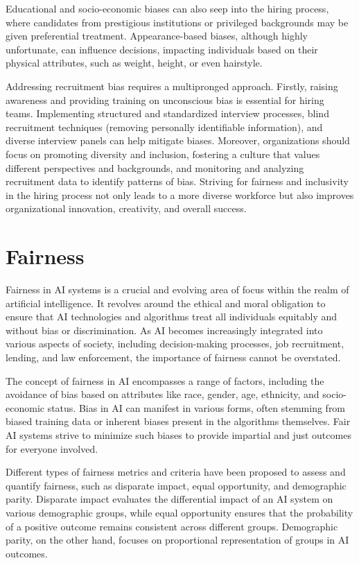 \documentclass[12pt,a4paper,openright,twoside]{book}
\begin{document}
Educational and socio-economic biases can also seep into the hiring process, where candidates from prestigious institutions or privileged backgrounds may be given preferential treatment. Appearance-based biases, although highly unfortunate, can influence decisions, impacting individuals based on their physical attributes, such as weight, height, or even hairstyle.

Addressing recruitment bias requires a multipronged approach. Firstly, raising awareness and providing training on unconscious bias is essential for hiring teams. Implementing structured and standardized interview processes, blind recruitment techniques (removing personally identifiable information), and diverse interview panels can help mitigate biases. Moreover, organizations should focus on promoting diversity and inclusion, fostering a culture that values different perspectives and backgrounds, and monitoring and analyzing recruitment data to identify patterns of bias. Striving for fairness and inclusivity in the hiring process not only leads to a more diverse workforce but also improves organizational innovation, creativity, and overall success.

\section{Fairness}
Fairness in AI systems is a crucial and evolving area of focus within the realm of artificial intelligence. It revolves around the ethical and moral obligation to ensure that AI technologies and algorithms treat all individuals equitably and without bias or discrimination. As AI becomes increasingly integrated into various aspects of society, including decision-making processes, job recruitment, lending, and law enforcement, the importance of fairness cannot be overstated.

The concept of fairness in AI encompasses a range of factors, including the avoidance of bias based on attributes like race, gender, age, ethnicity, and socio-economic status. Bias in AI can manifest in various forms, often stemming from biased training data or inherent biases present in the algorithms themselves. Fair AI systems strive to minimize such biases to provide impartial and just outcomes for everyone involved.

Different types of fairness metrics and criteria have been proposed to assess and quantify fairness, such as disparate impact, equal opportunity, and demographic parity. Disparate impact evaluates the differential impact of an AI system on various demographic groups, while equal opportunity ensures that the probability of a positive outcome remains consistent across different groups. Demographic parity, on the other hand, focuses on proportional representation of groups in AI outcomes.
\end{document}
